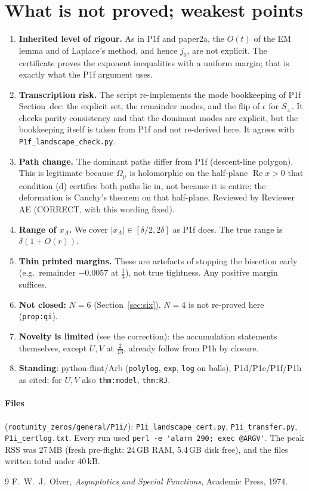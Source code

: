 \documentclass[11pt]{article}
\theoremstyle{remark}\newtheorem{remark}[theorem]{Remark}
\begin{document}
\section{What is not proved; weakest points}
\begin{enumerate}
\item \textbf{Inherited level of rigour.} As in P1f and paper2a, the $O(t)$ of the EM lemma and of Laplace's method, and hence $j_0$, are not explicit. The certificate proves the exponent inequalities with a uniform margin; that is exactly what the P1f argument uses.
\item \textbf{Transcription risk.} The script re-implements the mode bookkeeping of P1f Section~dec: the explicit set, the remainder modes, and the flip of $\epsilon$ for $S_\pm$. It checks parity consistency and that the dominant modes are explicit, but the bookkeeping itself is taken from P1f and not re-derived here. It agrees with \texttt{P1f\_landscape\_check.py}.
\item \textbf{Path change.} The dominant paths differ from P1f (descent-line polygon). This is legitimate because $\Omega_\mu$ is holomorphic on the half-plane $\operatorname{Re}x>0$ that condition (d) certifies both paths lie in, not because it is entire; the deformation is Cauchy's theorem on that half-plane. Reviewed by Reviewer AE (CORRECT, with this wording fixed).
\item \textbf{Range of $x_A$.} We cover $|x_A|\in[\delta/2,2\delta]$ as P1f does. The true range is $\delta(1+O(r))$.
\item \textbf{Thin printed margins.} These are artefacts of stopping the bisection early (e.g.\ remainder $-0.0057$ at $\frac13$), not true tightness. Any positive margin suffices.
\item \textbf{Not closed:} $N=6$ (Section~\ref{sec:six}). $N=4$ is not re-proved here (\texttt{prop:qi}).
\item \textbf{Novelty is limited} (see the correction): the accumulation statements themselves, except $U,V$ at $\frac2{13}$, already follow from P1h by closure.
\item \textbf{Standing}: python-flint/Arb (\texttt{polylog}, \texttt{exp}, \texttt{log} on balls), P1d/P1e/P1f/P1h as cited; for $U,V$ also \texttt{thm:model}, \texttt{thm:RJ}.
\end{enumerate}

\paragraph{Files} (\texttt{rootunity\_zeros/general/P1i/}): \texttt{P1i\_landscape\_cert.py}, \texttt{P1i\_transfer.py}, \texttt{P1i\_certlog.txt}. Every run used \verb|perl -e 'alarm 290; exec @ARGV'|. The peak RSS was 27\,MB (fresh pre-flight: 24\,GB RAM, 5.4\,GB disk free), and the files written total under 40\,kB.

\begin{thebibliography}{9}
 F.~W.~J.~Olver, \emph{Asymptotics and Special Functions}, Academic Press, 1974.
\end{thebibliography}
\end{document}
